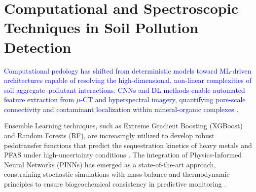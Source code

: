 \documentclass[environments,article,submit,pdftex,moreauthors]{Definitions/mdpi}
\begin{document}
\section{Computational and Spectroscopic Techniques in Soil Pollution
    Detection}\label{sec3}

\textcolor{blue}{Computational pedology has shifted from deterministic models toward ML-driven architectures capable of resolving the high-dimensional, non-linear complexities of soil aggregate--pollutant interactions. CNNs and DL methods enable automated feature extraction from $\mu$-CT and hyperspectral imagery, quantifying pore-scale connectivity and contaminant localization within mineral-organic complexes \cite{Demiral2026}.}

Ensemble Learning techniques, such as Extreme Gradient Boosting (XGBoost) and
Random Forests (RF), are increasingly utilized to develop robust pedotransfer
functions that predict the sequestration kinetics of heavy metals and PFAS
under high-uncertainty conditions \cite{agronomy15030676}. The integration
of Physics-Informed Neural Networks (PINNs) has emerged as a state-of-the-art
approach, constraining stochastic simulations with mass-balance and
thermodynamic principles to ensure biogeochemical consistency in predictive
monitoring \cite{Xuetall2025}.
\end{document}
